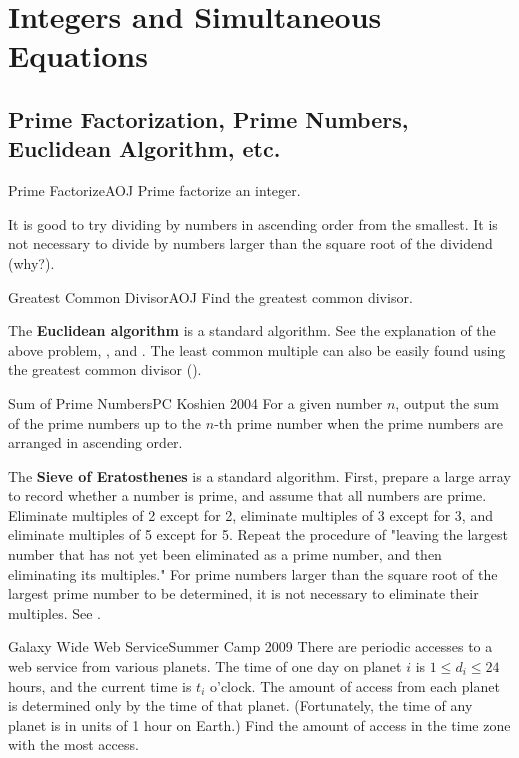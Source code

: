 \chapter{Integers and Simultaneous Equations}

\begin{versionbeta}
\section{Prime Factorization, Prime Numbers, Euclidean Algorithm, etc.}

\begin{psbox}{Prime Factorize}{AOJ}
Prime factorize an integer.

\end{psbox}
It is good to try dividing by numbers in ascending order from the smallest. It is not necessary to divide by numbers larger than the square root of the dividend (why?).

\begin{psbox}{Greatest Common Divisor}{AOJ}
Find the greatest common divisor.

\end{psbox}

The \textbf{Euclidean algorithm} is a standard algorithm. See the explanation of the above problem, \pcaojbook[pp.~441--443], and \pccbook[pp.~107--].
The least common multiple can also be easily found using the greatest common divisor ().

\begin{psbox}{Sum of Prime Numbers}{PC Koshien 2004}
For a given number $n$, output the sum of the prime numbers up to the $n$-th prime number when the prime numbers are arranged in ascending order.

\end{psbox}

The \textbf{Sieve of Eratosthenes} is a standard algorithm.
First, prepare a large array to record whether a number is prime, and assume that all numbers are prime. Eliminate multiples of 2 except for 2, eliminate multiples of 3 except for 3, and eliminate multiples of 5 except for 5. Repeat the procedure of "leaving the largest number that has not yet been eliminated as a prime number, and then eliminating its multiples." For prime numbers larger than the square root of the largest prime number to be determined, it is not necessary to eliminate their multiples. See \pcaojbook[pp.~438--439].

\begin{pbox}{Galaxy Wide Web Service}{Summer Camp 2009}
There are periodic accesses to a web service from various planets.
The time of one day on planet $i$ is $1\le d_i \le 24$ hours, and the current time is $t_i$ o'clock. The amount of access from each planet is determined only by the time of that planet. (Fortunately, the time of any planet is in units of 1 hour on Earth.)
Find the amount of access in the time zone with the most access.


\end{pbox}
\end{versionbeta}
